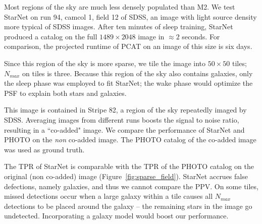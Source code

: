 Most regions of the sky are much less densely populated than M2. 
We test StarNet on run 94, camcol 1, field 12 of SDSS,
an image with light source density more typical of SDSS images.
After ten minutes of sleep training, StarNet produced a catalog on the full $1489\times 2048$ image in $\approx2$ seconds. 
For comparison, the projected runtime of PCAT on an image of this size is six days.  

Since this region of the sky is more sparse, we tile the image into $50\times 50$ tiles; $N_{max}$ on tiles is three. 
Because this region of the sky also contains galaxies, only the sleep phase was employed to fit StarNet; 
the wake phase would optimize the PSF to explain both stars and galaxies. 

This image is contained in Stripe 82, a region of the sky repeatedly imaged by SDSS.
Averaging images from different runs boosts the signal to noise ratio, resulting in a ``co-added" image. 
We compare the performance of StarNet and PHOTO on the {\itshape non} co-added image. 
The PHOTO catalog of the co-added image was used as ground truth. 

The TPR of StarNet is comparable with the TPR of the PHOTO catalog on the original (non co-added) image (Figure~\ref{fig:sparse_field}). 
StarNet accrues false defections, namely galaxies, and thus we cannot compare the PPV. 
On some tiles, missed detections occur when a large galaxy within a tile causes all $N_{max}$ detections to be placed around the galaxy -- the remaining stars in the image go undetected. 
Incorporating a galaxy model would boost our performance. 


